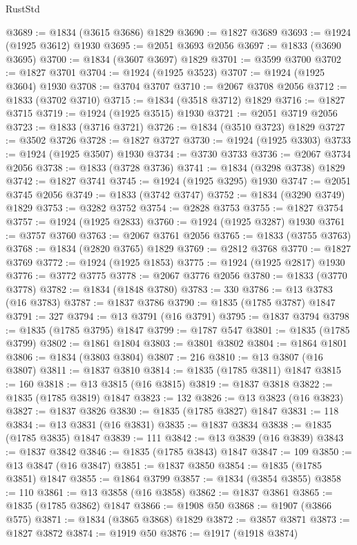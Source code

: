 \begin{lexlean}{RustStd}
\begin{coremodule}
{\begin{coremodule}
{{{{{@3689 := @1834 (@3615 @3686) @1829
@3690 := @1827 @3689
@3693 := @1924 (@1925 @3612) @1930
@3695 := @2051 @3693 @2056
@3697 := @1833 (@3690 @3695)
@3700 := @1834 (@3607 @3697) @1829
@3701 := @3599 @3700
@3702 := @1827 @3701
@3704 := @1924 (@1925 @3523)
@3707 := @1924 (@1925 @3604) @1930
@3708 := @3704 @3707
@3710 := @2067 @3708 @2056
@3712 := @1833 (@3702 @3710)
@3715 := @1834 (@3518 @3712) @1829
@3716 := @1827 @3715
@3719 := @1924 (@1925 @3515) @1930
@3721 := @2051 @3719 @2056
@3723 := @1833 (@3716 @3721)
@3726 := @1834 (@3510 @3723) @1829
@3727 := @3502 @3726
@3728 := @1827 @3727
@3730 := @1924 (@1925 @3303)
@3733 := @1924 (@1925 @3507) @1930
@3734 := @3730 @3733
@3736 := @2067 @3734 @2056
@3738 := @1833 (@3728 @3736)
@3741 := @1834 (@3298 @3738) @1829
@3742 := @1827 @3741
@3745 := @1924 (@1925 @3295) @1930
@3747 := @2051 @3745 @2056
@3749 := @1833 (@3742 @3747)
@3752 := @1834 (@3290 @3749) @1829
@3753 := @3282 @3752
@3754 := @2828 @3753
@3755 := @1827 @3754
@3757 := @1924 (@1925 @2833)
@3760 := @1924 (@1925 @3287) @1930
@3761 := @3757 @3760
@3763 := @2067 @3761 @2056
@3765 := @1833 (@3755 @3763)
@3768 := @1834 (@2820 @3765) @1829
@3769 := @2812 @3768
@3770 := @1827 @3769
@3772 := @1924 (@1925 @1853)
@3775 := @1924 (@1925 @2817) @1930
@3776 := @3772 @3775
@3778 := @2067 @3776 @2056
@3780 := @1833 (@3770 @3778)
@3782 := @1834 (@1848 @3780)
@3783 := 330
@3786 := @13 @3783 (@16 @3783)
@3787 := @1837 @3786
@3790 := @1835 (@1785 @3787) @1847
@3791 := 327
@3794 := @13 @3791 (@16 @3791)
@3795 := @1837 @3794
@3798 := @1835 (@1785 @3795) @1847
@3799 := @1787 @547
@3801 := @1835 (@1785 @3799)
@3802 := @1861 @1804
@3803 := @3801 @3802
@3804 := @1864 @1801
@3806 := @1834 (@3803 @3804)
@3807 := 216
@3810 := @13 @3807 (@16 @3807)
@3811 := @1837 @3810
@3814 := @1835 (@1785 @3811) @1847
@3815 := 160
@3818 := @13 @3815 (@16 @3815)
@3819 := @1837 @3818
@3822 := @1835 (@1785 @3819) @1847
@3823 := 132
@3826 := @13 @3823 (@16 @3823)
@3827 := @1837 @3826
@3830 := @1835 (@1785 @3827) @1847
@3831 := 118
@3834 := @13 @3831 (@16 @3831)
@3835 := @1837 @3834
@3838 := @1835 (@1785 @3835) @1847
@3839 := 111
@3842 := @13 @3839 (@16 @3839)
@3843 := @1837 @3842
@3846 := @1835 (@1785 @3843) @1847
@3847 := 109
@3850 := @13 @3847 (@16 @3847)
@3851 := @1837 @3850
@3854 := @1835 (@1785 @3851) @1847
@3855 := @1864 @3799
@3857 := @1834 (@3854 @3855)
@3858 := 110
@3861 := @13 @3858 (@16 @3858)
@3862 := @1837 @3861
@3865 := @1835 (@1785 @3862) @1847
@3866 := @1908 @50
@3868 := @1907 (@3866 @575)
@3871 := @1834 (@3865 @3868) @1829
@3872 := @3857 @3871
@3873 := @1827 @3872
@3874 := @1919 @50
@3876 := @1917 (@1918 @3874)
}}}}}
\end{coremodule}}
\end{coremodule}
\end{lexlean}
